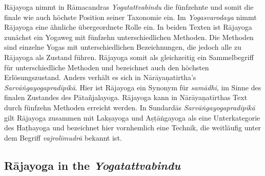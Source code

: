 Rājayoga nimmt in Rāmacandras \emph{Yogatattvabindu} die fünfzehnte und somit die finale wie auch höchste Position seiner Taxonomie ein. Im \textit{Yogasvarodaya} nimmt Rājayoga eine ähnliche übergeordnete Rolle ein. In beiden Texten ist Rājayoga zunächst ein Yogaweg mit fünfzehn unterschiedlichen Methoden. Die Methoden sind einzelne Yogas mit unterschiedlichen Bezeichnungen, die jedoch alle zu Rājayoga als Zustand führen. Rājayoga somit als gleichzeitig ein Sammelbegriff für unterschiedliche Methoden und bezeichnet auch den höchsten Erlösungszustand. Anders verhält es sich in Nārāyaṇatirtha's \textit{Sarvāṅgayogapradīpikā}. Hier ist Rājayoga ein Synonym für \textit{samādhi}, im Sinne des finalen Zustandes des Pātañjalayoga. Rājayoga kann in Nārāyaṇatīrthas Text durch fünfzehn Methoden erreicht werden. In Sundardās \emph{Sarvāṅgayogapradīpikā} gilt Rājayoga zusammen mit Lakṣayoga und Aṣṭāṅgayoga als eine Unterkategorie des Haṭhayoga und bezeichnet hier vornhemlich eine Technik, die weitläufig unter dem Begriff \textit{vajrolīmudrā} bekannt ist.

\subsection{Rājayoga in the \emph{Yogatattvabindu}}

